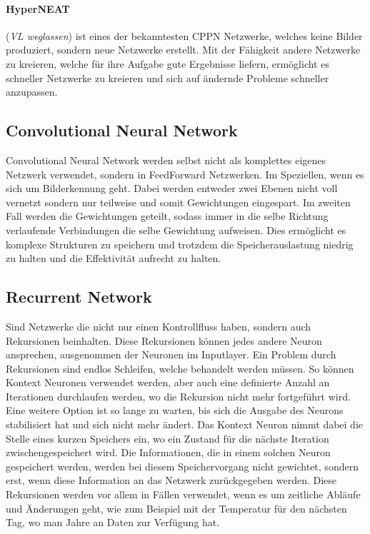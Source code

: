 \paragraph{HyperNEAT} (\textit{VL weglassen}) ist eines der bekanntesten CPPN Netzwerke, welches keine Bilder produziert, sondern neue Netzwerke erstellt.
Mit der Fähigkeit andere Netzwerke zu kreieren, welche für ihre Aufgabe gute Ergebnisse liefern, ermöglicht es schneller Netzwerke zu kreieren und sich auf ändernde Probleme schneller anzupassen.

\subsection{Convolutional Neural Network}

Convolutional Neural Network werden selbst nicht als komplettes eigenes Netzwerk verwendet, sondern in FeedForward Netzwerken.
Im Speziellen, wenn es sich um Bilderkennung geht.
Dabei werden entweder zwei Ebenen nicht voll vernetzt sondern nur teilweise und somit Gewichtungen eingespart.
Im zweiten Fall werden die Gewichtungen geteilt, sodass immer in die selbe Richtung verlaufende Verbindungen die selbe Gewichtung aufweisen.
Dies ermöglicht es komplexe Strukturen zu speichern und trotzdem die Speicherauslastung niedrig zu halten und die Effektivität aufrecht zu halten.


\subsection{Recurrent Network}

Sind Netzwerke die nicht nur einen Kontrollfluss haben, sondern auch Rekursionen beinhalten. 
Diese Rekursionen können jedes andere Neuron ansprechen, ausgenommen der Neuronen im Inputlayer.
Ein Problem durch Rekursionen sind endlos Schleifen, welche behandelt werden müssen.
So können Kontext Neuronen verwendet werden, aber auch eine definierte Anzahl an Iterationen durchlaufen werden, wo die Rekursion nicht mehr fortgeführt wird. 
Eine weitere Option ist so lange zu warten, bis sich die Ausgabe des Neurons stabilisiert hat und sich nicht mehr ändert.
Das Kontext Neuron nimmt dabei die Stelle eines kurzen Speichers ein, wo ein Zustand für die nächste Iteration zwischengespeichert wird.
Die Informationen, die in einem solchen Neuron gespeichert werden, werden bei diesem Speichervorgang nicht gewichtet, sondern erst, wenn diese Information an das Netzwerk zurückgegeben werden.
Diese Rekursionen werden vor allem in Fällen verwendet, wenn es um zeitliche Abläufe und Änderungen geht, wie zum Beispiel mit der Temperatur für den nächsten Tag, wo man Jahre an Daten zur Verfügung hat.

